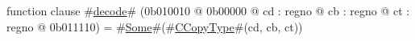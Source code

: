function clause #\hyperref[zdecode]{decode}# (0b010010 @ 0b00000 @ cd : regno @ cb : regno @ ct : regno @ 0b011110) = #\hyperref[zSome]{Some}#(#\hyperref[zCCopyType]{CCopyType}#(cd, cb, ct))
